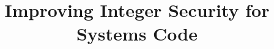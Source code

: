 \documentclass{article}
\begin{document}
\title{Improving Integer Security for Systems Code}
\author{}
\date{}
\maketitle













\end{document}
